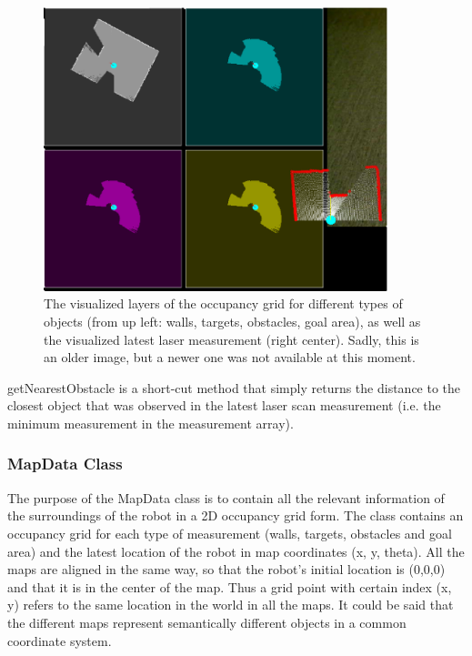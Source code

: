 \documentclass[a4paper,10pt]{article}
\begin{document}
\begin{figure}[h]	%
\begin{center}
\includegraphics[width=10.0cm]{slam_0.eps}
\caption{The visualized layers of the occupancy grid for different types of objects (from up left: walls, targets, obstacles, goal area), as well as the visualized latest laser measurement (right center). Sadly, this is an older image, but a newer one was not available at this moment.}
\label{slam_laser_data} %
\end{center}
\end{figure}

getNearestObstacle is a short-cut method that simply returns the distance to the closest object that was observed in the latest laser scan measurement (i.e. the minimum measurement in the measurement array).

\subsubsection{MapData Class}

The purpose of the MapData class is to contain all the relevant information of the surroundings of the robot in a 2D occupancy grid form. The class contains an occupancy grid for each type of measurement (walls, targets, obstacles and goal area) and the latest location of the robot in map coordinates (x, y, theta). All the maps are aligned in the same way, so that the robot’s initial location is (0,0,0) and that it is in the center of the map. Thus a grid point with certain index (x, y) refers to the same location in the world in all the maps. It could be said that the different maps represent semantically different objects in a common coordinate system.
\end{document}

